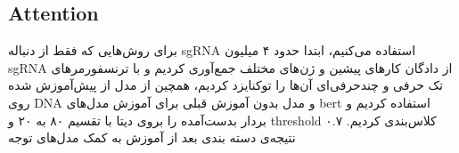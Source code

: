\documentclass[12pt,a4paper,BCOR=.7cm,headsepline,bibliography=totoc]{report}
\begin{document}
\subsection{Attention}
برای روش‌هایی که فقط از دنباله sgRNA استفاده می‌کنیم، ابتدا حدود ۴ میلیون sgRNA از دادگان کار‌های پیشین و ژن‌های مختلف جمع‌آوری کردیم و با ترنسفورمر‌های تک حرفی و چندحرفی‌ای آن‌ها را توکنایزد کردیم، همچین از مدل از پیش‌آموزش شده روی DNA و مدل بدون آموزش قبلی برای آموزش مدل‌های bert استفاده کردیم و بردار بدست‌آمده را بروی دیتا با تقسیم ۸۰ به ۲۰ و threshold ۰.۷ کلاس‌بندی کردیم.
نتیجه‌ی دسته بندی بعد از آموزش به کمک مدل‌های توجه
\begin{table}[H]
\begin{latin}
\begin{adjustbox}{center}
\end{adjustbox}
\end{latin}
\caption{نتیجه‌ی آموزش مدل‌های DNAbert برای کلاس‌بندی sgRNAهای موثر و ناموثر }
\end{table}
\end{document}
